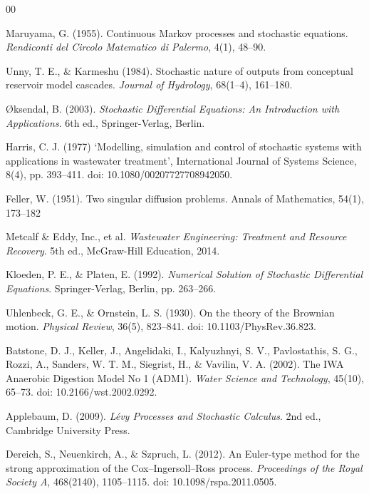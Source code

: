 \documentclass[conference]{IEEEtran}
\theoremstyle{definitionsc}
\theoremstyle{plainsc}
\theoremstyle{remarksc}
\begin{document}
\begin{thebibliography}{00}

 Maruyama, G. (1955). Continuous Markov processes and stochastic equations. \textit{Rendiconti del Circolo Matematico di Palermo}, 4(1), 48--90.

 Unny, T. E., \& Karmeshu (1984). Stochastic nature of outputs from conceptual reservoir model cascades. \textit{Journal of Hydrology}, 68(1--4), 161--180.

 \O ksendal, B. (2003). \textit{Stochastic Differential Equations: An Introduction with Applications}. 6th ed., Springer-Verlag, Berlin.

 Harris, C. J. (1977) ‘Modelling, simulation and control of stochastic systems with applications in wastewater treatment’, International Journal of Systems Science, 8(4), pp. 393–411. doi: 10.1080/00207727708942050.

 Feller, W. (1951). Two singular diffusion problems. Annals of Mathematics, 54(1), 173–182

 Metcalf \& Eddy, Inc., et al. \textit{Wastewater Engineering: Treatment and Resource Recovery}. 5th ed., McGraw-Hill Education, 2014.

 Kloeden, P. E., \& Platen, E. (1992). \textit{Numerical Solution of Stochastic Differential Equations}. Springer-Verlag, Berlin, pp. 263--266.

 Uhlenbeck, G. E., \& Ornstein, L. S. (1930). On the theory of the Brownian motion. \textit{Physical Review}, 36(5), 823--841. doi: 10.1103/PhysRev.36.823.

 Batstone, D. J., Keller, J., Angelidaki, I., Kalyuzhnyi, S. V., Pavlostathis, S. G., Rozzi, A., Sanders, W. T. M., Siegrist, H., \& Vavilin, V. A. (2002). The IWA Anaerobic Digestion Model No 1 (ADM1). \textit{Water Science and Technology}, 45(10), 65--73. doi: 10.2166/wst.2002.0292.

 Applebaum, D. (2009). \textit{L\'evy Processes and Stochastic Calculus}. 2nd ed., Cambridge University Press.

 Dereich, S., Neuenkirch, A., \& Szpruch, L. (2012). An Euler-type method for the strong approximation of the Cox--Ingersoll--Ross process. \textit{Proceedings of the Royal Society A}, 468(2140), 1105--1115. doi: 10.1098/rspa.2011.0505.



\end{thebibliography}
\end{document}
